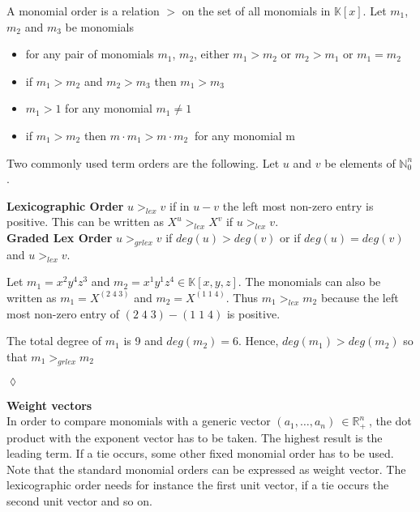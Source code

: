\begin{env_definition} 
\cite{saleemi}
A monomial order is a relation $>$ on the set of all monomials in $\mathbb{K}\left[x\right]$.
Let $m_{1}$, $m_{2}$ and $m_{3}$ be monomials
\begin{center}

\begin{itemize}

\item
for any pair of monomials $m_{1}$, $m_{2}$, either $m_{1} > m_{2}$ or $m_{2} > m_{1}$ or $m_{1} = m_{2}$ 
\item
if $m_{1} > m_{2} $ and $m_{2} > m_{3}$ then $m_{1} > m_{3}$
\item
$m_{1} > 1$ for any monomial $m_{1} \neq 1$
\item
if $m_{1} > m_{2}$ then $m \cdot m_{1} > m \cdot m_{2}~$ for any monomial m

\end{itemize}
 
\end{center}

\end{env_definition}


Two commonly used term orders are the following.
Let $u$ and $v$ be elements of $\mathbb{N}^{n}_{0}$. 

\textbf{Lexicographic Order} \cite{saleemi}
$u >_{lex} v $ if in $u-v$ the left most non-zero entry is positive.
This can be written as $X^{u} >_{lex} X^{v}$ if $u >_{lex} v $.\\


\textbf{Graded Lex Order} \cite{saleemi}
$u >_{grlex} v $ if $ deg(u)>deg(v)$ or if $ deg(u)=deg(v)$ and $u >_{lex} v$.

\newpage
\begin{env_example} \normalfont
Let $m_{1} = x^{2}y^{4}z^{3}$ and $m_{2}= x^{1}y^{1}z^{4} \in \mathbb{K}\left[ x,y,z\right]  $.
The monomials can also be written as $m_{1} = X^{(2 \; 4 \; 3)}$ and $m_{2} = X^{(1 \; 1 \; 4)}$.
Thus $m_{1}>_{lex} m_{2}$ because the left most non-zero entry of $ (2 \; 4 \; 3) - (1 \; 1 \; 4)$ is positive.

The total degree of $m_{1}$ is 9 and $deg(m_{2})=6$. Hence, $deg(m_{1})>deg(m_{2})$ so that $m_{1}>_{grlex} m_{2}$ 
\begin{flushright}
$\lozenge$
\end{flushright}
\end{env_example}
  

\textbf{Weight vectors} \\
In order to compare monomials with a generic vector $\left({a}_{1},\dots ,{a}_{n}\right)~\in \mathbb{R}^{n}_{+}~$, the dot product with the exponent vector has to be taken. The highest result is the leading term. If a tie occurs, some other fixed monomial order has to be used. Note that the standard monomial orders can be expressed as weight vector. The lexicographic order needs for instance the first unit vector, if a tie occurs the second unit vector and so on.

